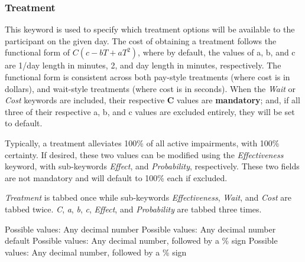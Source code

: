 \documentclass{article}
\begin{document}
\subsubsection{Treatment}
This keyword is used to specify which treatment options will be available to the participant on the given day. The cost of obtaining a treatment follows the functional form of $C(c - bT + aT^2)$, where by default, the values of a, b, and c are 1\slash day length in minutes, 2, and day length in minutes, respectively. The functional form is consistent across both pay-style treatments (where cost is in dollars), and wait-style treatments (where cost is in seconds). When the \textit{Wait} or \textit{Cost} keywords are included, their respective \textbf{C} values are \textbf{mandatory}; and, if all three of their respective a, b, and c values are excluded entirely, they will be set to default. 

Typically, a treatment alleviates 100\% of all active impairments, with 100\% certainty. If desired, these two values can be modified using the \textit{Effectiveness} keyword, with sub-keywords \textit{Effect}, and \textit{Probability}, respectively. These two fields are not mandatory and will default to 100\% each if excluded.

\textit{Treatment} is tabbed once while sub-keywords \textit{Effectiveness}, \textit{Wait}, and \textit{Cost} are tabbed twice. \textit{C}, \textit{a}, \textit{b}, \textit{c}, \textit{Effect}, and \textit{Probability} are tabbed three times. \newline

 \newline
\indent Possible values: \newline
\indent\indent Any decimal number \newline\newline
{} \newline
\indent  Possible values: \newline
\indent\indent  Any decimal number \newline
\indent\indent  default \newline\newline
{} \newline
\indent  Possible values: \newline
\indent\indent  Any decimal number, followed by a \% sign \newline\newline
{} \newline
\indent  Possible values: \newline
\indent\indent  Any decimal number, followed by a \% sign \newline
    
\end{document}
